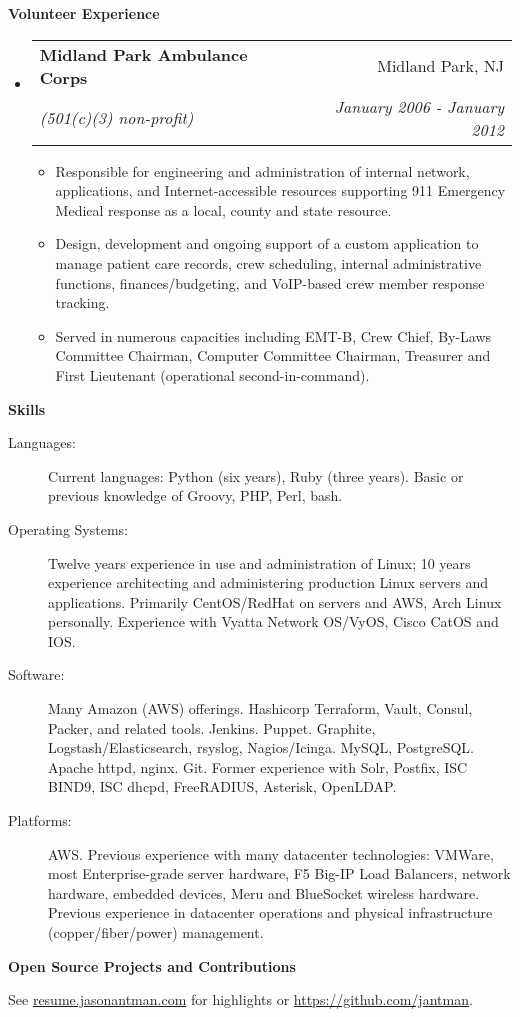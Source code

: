 \documentclass[letterpaper,11pt]{article}
\makeatletter
\newcommand{\resitem}[1]{\item #1 \vspace{-2pt}}
\newcommand{\resheading}[1]{{\large \colorbox{mygrey}{\begin{minipage}{\textwidth}{\textbf{#1 \vphantom{p\^{E}}}}\end{minipage}}}}
\newcommand{\ressubheading}[4]{
\begin{tabular*}{7.0in}{l@{\extracolsep{\fill}}r}
		\textbf{#1} & #2 \\
		\textit{#3} & \textit{#4} \\
\end{tabular*}\vspace{-6pt}}
\makeatother
\begin{document}
\resheading{Volunteer Experience}
\begin{itemize}
\item
        \ressubheading{Midland Park Ambulance Corps}{Midland Park, NJ}{(501(c)(3) non-profit)}{January 2006 - January 2012}
        \begin{itemize}
                \resitem{Responsible for engineering and administration of internal network, applications, and Internet-accessible resources supporting 911 Emergency Medical response as a local, county and state resource.}
                \resitem{Design, development and ongoing support of a custom application to manage patient care records, crew scheduling, internal administrative functions, finances/budgeting, and VoIP-based crew member response tracking.}
                \resitem{Served in numerous capacities including EMT-B, Crew Chief, By-Laws Committee Chairman, Computer Committee Chairman, Treasurer and First Lieutenant (operational second-in-command).}
        \end{itemize}
\end{itemize}

\resheading{Skills}

\begin{description}
\item[Languages:]
Current languages: Python (six years), Ruby (three years). Basic or previous knowledge of Groovy, PHP, Perl, bash.
\item[Operating Systems:]
Twelve years experience in use and administration of Linux; 10 years experience architecting and administering production Linux servers and applications.
Primarily CentOS/RedHat on servers and AWS, Arch Linux personally. Experience with Vyatta Network OS/VyOS, Cisco CatOS and IOS.
\item[Software:]
Many Amazon (AWS) offerings. Hashicorp Terraform, Vault, Consul, Packer, and related tools. Jenkins. Puppet. Graphite, Logstash/Elasticsearch, rsyslog, Nagios/Icinga. MySQL, PostgreSQL. Apache httpd, nginx. Git.
Former experience with Solr, Postfix, ISC BIND9, ISC dhcpd, FreeRADIUS, Asterisk, OpenLDAP.

\item[Platforms:]
AWS. Previous experience with many datacenter technologies: VMWare, most Enterprise-grade server hardware, F5 Big-IP Load Balancers, network hardware, embedded devices, Meru and BlueSocket wireless hardware. Previous experience in datacenter operations and physical infrastructure (copper/fiber/power) management.
\end{description}

\resheading{Open Source Projects and Contributions}
\begin{description}
\item{See \href{http://resume.jasonantman.com}{resume.jasonantman.com} for highlights or \href{https://github.com/jantman}{https://github.com/jantman}.}
\end{description}
\end{document}
